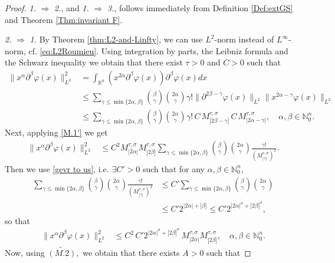 \documentclass{article}
\theoremstyle{thmstyleone}
\theoremstyle{thmstyletwo}%
\theoremstyle{thmstylethree}%
\begin{document}
\begin{proof}
{\em 1.} $ \Rightarrow $ {\em 2.}, 
and {\em 1.} $ \Rightarrow $ {\em 3.}, follows immediately from   Definition \ref{Def:extGS} and Theorem \ref{Thm:invariant F}.

{\em 2.} $ \Rightarrow $ {\em 1.}
   By Theorem \ref{thm:L2-and-Linfty}, we can use $L^2$-norm instead of $L^\infty$-norm, cf. \eqref{eq:L2Roumieu}. Using integration by parts, the Leibniz formula and the Schwarz inequality we obtain that there exist $\tau>0$ and $C>0$ such that 
    \begin{align*}
        \|x^\alpha \partial^\beta\varphi(x)\|^2_{L^2} & =\int_{\mathbb R^n}(x^{2\alpha}\partial^\beta \varphi(x))\partial^\beta \varphi(x) dx\\
        &\leq \sum_{\gamma\leq \min\{2\alpha,\beta\}}\binom{\beta}{\gamma}\binom{2\alpha}{\gamma}\gamma!\|\partial^{2\beta-\gamma}\varphi(x)\|_{L^2}\|x^{2\alpha-\gamma}\varphi(x)\|_{L^2}\\
        &\leq \sum_{\gamma\leq \min\{2\alpha,\beta\}}\binom{\beta}{\gamma}\binom{2\alpha}{\gamma}\gamma!\,C\,M^{\tau,\sigma}_{|2\beta-\gamma|}\,C\,M^{\tau,\sigma}_{|2\alpha-\gamma|},\quad \alpha,\beta\in \mathbb N_0^n.
        \end{align*}
    Next, applying \eqref{M.1'} we get
    \begin{align*}
        \|x^\alpha \partial^\beta\varphi(x)\|^2_{L^2} &\leq C^2  M^{\tau,\sigma}_{|2\alpha|}M^{\tau,\sigma}_{|2\beta|} \sum_{\gamma\leq \min\{2\alpha,\beta\}}\binom{\beta}{\gamma}\binom{2\alpha}{\gamma}\frac{\gamma!}{(M^{\tau,\sigma}_{|\gamma|})^2}.
    \end{align*}
Then we use \eqref{gevr to us}, i.e. $\exists C'>0$ such that for any $\alpha,\beta\in \mathbb N_0^n$,
    \begin{align*}
        \sum_{\gamma\leq \min\{2\alpha,\beta\}}\binom{\beta}{\gamma}\binom{2\alpha}{\gamma}\frac{\gamma!}{(M^{\tau,\sigma}_{|\gamma|})^2}&\leq C' \sum_{\gamma\leq \min\{2\alpha,\beta\}}\binom{\beta}{\gamma}\binom{2\alpha}{\gamma}\\
        &\leq C' 2^{|2\alpha|+|\beta|} \leq C' 2^{|2\alpha|^\sigma+|2\beta|^\sigma},
    \end{align*}
so that
     \begin{align*}
        \|x^\alpha \partial^\beta\varphi(x)\|^2_{L^2} &\leq C^2  \,C' 2^{|2\alpha|^\sigma+|2\beta|^\sigma}\,M^{\tau,\sigma}_{|2\alpha|}M^{\tau,\sigma}_{|2\beta|}, \quad \alpha,\beta\in \mathbb N_0^n.
    \end{align*}
    Now, using $\widetilde{(M.2)},$  we obtain that there exists $A>0$ such that

\end{proof}
\end{document}
